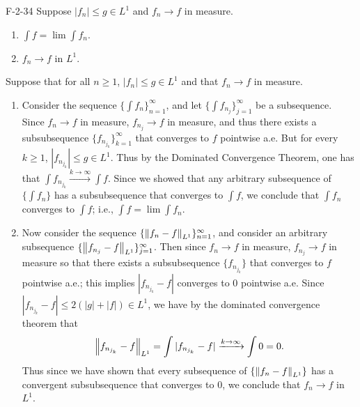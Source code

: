 \documentclass{article}
\begin{document}
	\begin{prb}{F-2-34}
		Suppose $|f_{n}| \leq g \in L^{1}$  and $f_{n} \to f$ in measure. \vspace{-0.25cm} 
		\begin{enumerate}[itemsep =-2pt,label = (\alph{*})]
			\item $\int f = \lim \int f_{n}$. 
			\item $f_{n} \to f$ in $L^{1}$. 
		\end{enumerate}
	\end{prb}
	Suppose that for all $n \geq 1$, $|f_{n}| \leq g \in L^{1}$ and that $f_{n} \to f$ in measure. 
	\begin{enumerate}[itemsep =-2pt,label = (\alph{*})]
		\item Consider the sequence $\{\int f_{n}\}_{n = 1}^{\infty}$, and let $\{\int f_{n_{j}}\}_{j = 1}^{\infty}$ be a subsequence. Since $f_{n} \to f$ in measure, $f_{n_{j}} \to f$ in measure, and thus there exists a subsubsequence $\{f_{n_{j_{k}}}\}_{k = 1}^{\infty}$ that converges to $f$ pointwise a.e. But for every $k \geq 1$, $|f_{n_{j_{k}}}| \leq g \in L^{1}$. Thus by the Dominated Convergence Theorem, one has that $\int f_{n_{j_{k}}} \xrightarrow{k \to \infty} \int f$. Since we showed that any arbitrary subsequence of $\{\int f_{n}\}$ has a subsubsequence that converges to $\int f$, we conclude that $\int f_{n}$ converges to $\int f$; i.e., $\int f = \lim \int f_{n}$. 
		\item Now consider the sequence $\{\left\Vert f_{n} - f \right\Vert_{L^{1}}\}_{n = 1}^{\infty}$, and consider an arbitrary subsequence $\{\left\Vert f_{n_{j}} - f \right\Vert_{L^{1}}\}_{j = 1}^{\infty}$. Then since $f_{n} \to f$ in measure, $f_{n_{j}} \to f$ in measure so that there exists a subsubsequence $\{f_{n_{j_{k}}}\}$ that converges to $f$ pointwise a.e.; this implies $|f_{n_{j_{k}}} - f|$ converges to 0 pointwise a.e. Since $|f_{n_{j_{k}}} - f| \leq 2(|g| + |f|) \in L^{1}$, we have by the dominated convergence theorem that 
		\begin{equation*}
			\left\Vert f_{n_{j_{k}}} - f \right\Vert_{L^{1}} = \int |f_{n_{j_{k}}} - f| \xrightarrow{k \to \infty} \int 0 = 0. 
		\end{equation*}
		Thus since we have shown that every subsequence of $\{\left\Vert f_{n} - f \right\Vert_{L^{1}}\}$ has a convergent subsubsequence that converges to $0$, we conclude that $f_{n} \to f$ in $L^{1}$. 
	\end{enumerate}
	
\end{document}
